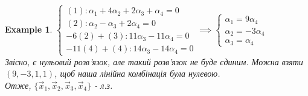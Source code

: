 \documentclass[a4paper, 10pt]{article}
\theoremstyle{theoremdd}
\theoremstyle{theoremdd}
\theoremstyle{theoremdd}
\theoremstyle{theoremdd}
\newtheorem{example}[theorem]{Example}
\theoremstyle{theoremdd}
\theoremstyle{theoremdd}
\theoremstyle{theoremdd}
\theoremstyle{theoremdd}
\begin{document}
\begin{example}
	$\begin{cases}
	(1): \alpha_1 + 4\alpha_2 + 2\alpha_3 + \alpha_4 = 0\\
	(2): \alpha_2 - \alpha_3 + 2\alpha_4 = 0\\
	-6(2)+(3): 11\alpha_3 - 11\alpha_4 = 0\\
	-11(4)+(4): 14\alpha_3 - 14\alpha_4 = 0
	\end{cases} 
	\implies
	\begin{cases}
	\alpha_1 = 9\alpha_4\\
	\alpha_2 = -3\alpha_4\\
	\alpha_3 = \alpha_4
	\end{cases} 
	$\\
	Звісно, є нульовий розв'язок, але такий розв'язок не буде єдиним. Можна взяти $(9,-3,1,1)$, щоб наша лінійна комбінація була нулевою.\\
	Отже, $\{\vec{x}_1,\vec{x}_2,\vec{x}_3,\vec{x}_4\}$ - л.з.
	\end{example}
	
\end{document}
